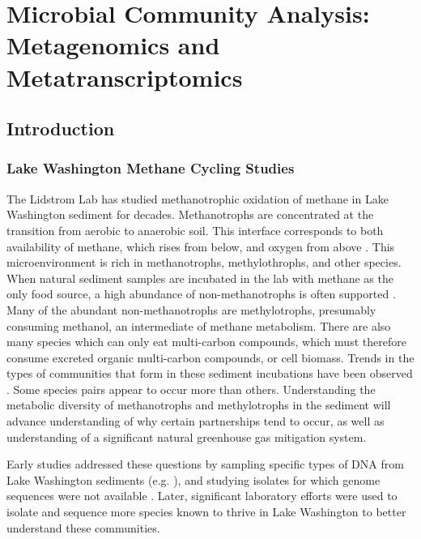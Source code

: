 \chapter{Microbial Community Analysis: Metagenomics and Metatranscriptomics}
\label{chapter:B}

\section{Introduction}
\subsection{Lake Washington Methane Cycling Studies}

The Lidstrom Lab has studied methanotrophic oxidation of methane in Lake Washington sediment for decades.
Methanotrophs are concentrated at the transition from aerobic to anaerobic soil.
This interface corresponds to both availability of methane, which rises from below, and oxygen from above \cite{lidstrom1984gradients, kuivilal1988, auman2000gradients}. %
This microenvironment is rich in methanotrophs, methylothrophs, and other species.
When natural sediment samples are incubated in the lab with methane as the only food source, a high abundance of non-methanotrophs is often supported \cite{oshkin2015LW}.
Many of the abundant non-methanotrophs are methylotrophs, presumably consuming methanol, an intermediate of methane metabolism.
There are also many species which can only eat multi-carbon compounds, which must therefore consume excreted organic multi-carbon compounds, or cell biomass.
Trends in the types of communities that form in these sediment incubations have been observed  \cite{oshkin2015LW}.
Some species pairs appear to occur more than others.
Understanding the metabolic diversity of methanotrophs and methylotrophs in the sediment will advance understanding of why certain partnerships tend to occur, as well as understanding of a significant natural greenhouse gas mitigation system.

Early studies addressed these questions by sampling specific types of DNA from Lake Washington sediments (e.g. \cite{auman2002, costello2002, nercessian2005}), and studying isolates for which genome sequences were not available \cite{auman2000gradients, kalyuzhnaya2005Methylosarcina, kalyuzhnaya2006methylotenera}.
Later, significant laboratory efforts were used to isolate and sequence more species known to thrive in Lake Washington
    \cite{kalyuzhnaya2011isolates, beck2015isolates, mctaggart2015, kalyuzhnaya2015} to better understand these communities.


